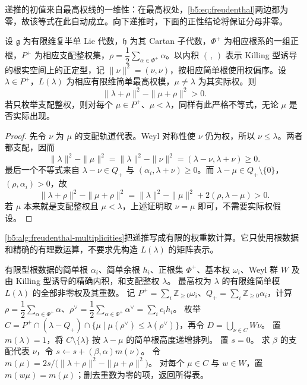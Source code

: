 递推的初值来自最高权线的一维性：在最高权处，\eqref{b5:eq:freudenthal}两边都为零，故该等式在此自动成立。向下递推时，下面的正性结论将保证分母非零。

\begin{proposition}\label{b5:prop:freudenthal-denominator}
	设 \(\mathfrak g\) 为有限维复半单 Lie 代数，\(\mathfrak h\) 为其 Cartan 子代数，\(\Phi^+\) 为相应根系的一组正根，\(P^+\) 为相应支配整权集，\(\rho=\dfrac12\sum_{\alpha\in\Phi^+}\alpha\)。以内积 \((\, ,\,)\) 表示 Killing 型诱导的根实空间上的正定型，记 \(\|\nu\|^2=(\nu,\nu)\)，按相应简单根使用权偏序。设 \(\lambda\in P^+\)，\(L(\lambda)\) 为相应有限维简单最高权模，\(\mu\ne\lambda\) 为其实际权。则
	\[
		\|\lambda+\rho\|^2-\|\mu+\rho\|^2>0.
	\]
	若只枚举支配整权，则对每个 \(\mu\in P^+\)、\(\mu<\lambda\)，同样有此严格不等式，无论 \(\mu\) 是否实际出现。
\end{proposition}
\begin{proof}
	先令 \(\nu\) 为 \(\mu\) 的支配轨道代表。Weyl 对称性使 \(\nu\) 仍为权，所以 \(\nu\le\lambda\)。两者都支配，因而
	\[
		\|\lambda\|^2-\|\mu\|^2 =\|\lambda\|^2-\|\nu\|^2 =(\lambda-\nu,\lambda+\nu)\ge0.
	\]
	最后一个不等式来自 \(\lambda-\nu\in Q_+\) 与 \((\alpha_i,\lambda+\nu)\ge0\)。而 \(\lambda-\mu\in Q_+\setminus\{0\}\)， \((\rho,\alpha_i)>0\)，故
	\[
		\|\lambda+\rho\|^2-\|\mu+\rho\|^2 =\|\lambda\|^2-\|\mu\|^2+2(\rho,\lambda-\mu)>0.
	\]
	若 \(\mu\) 本来就是支配整权且 \(\mu<\lambda\)，上述证明取 \(\nu=\mu\) 即可，不需要实际权假设。
\end{proof}

\cref{b5:alg:freudenthal-multiplicities}把递推写成有限的权重数计算。它只使用根数据和精确的有理数运算，不要求先构造 \(L(\lambda)\) 的矩阵表示。

\begin{algorithm}[htbp]
	\caption{Freudenthal 权重数计算}
	\label{b5:alg:freudenthal-multiplicities}
	\begin{algorithmsteps}
		{有限型根数据的简单根 \(\alpha_i\)、简单余根 \(h_i\)、正根集 \(\Phi^+\)、基本权 \(\omega_i\)、Weyl 群 \(W\) 及由 Killing 型诱导的精确内积，和支配整权 \(\lambda\)。}
		{最高权为 \(\lambda\) 的有限维简单模 \(L(\lambda)\) 的全部非零权及其重数。}
		\State 记 \(P^+=\sum_i\mathbb Z_{\ge0}\omega_i\)、\(Q_+=\sum_i\mathbb Z_{\ge0}\alpha_i\)，计算
		\(\rho=\dfrac12\sum_{\alpha\in\Phi^+}\alpha\)、\(\rho^\vee=\dfrac12\sum_{\alpha\in\Phi^+}\alpha^\vee=\sum_i c_i h_i\)。
		\State 枚举 \(C=P^+\cap(\lambda-Q_+)\cap\{\mu\mid\mu(\rho^\vee)\le\lambda(\rho^\vee)\}\)，再令 \(D=\bigcup_{\nu\in C}W\nu\)。
		\State 置 \(m(\lambda)=1\)，将 \(C\setminus\{\lambda\}\) 按 \(\lambda-\mu\) 的简单根高度递增排列。
			\State 置 \(s=0\)。
				\State 求 \(\beta\) 的支配代表 \(\nu\)，令 \(s\gets s+(\beta,\alpha)m(\nu)\)。
			\EndFor
			\State 令 \(m(\mu)=2s/\bigl(\|\lambda+\rho\|^2-\|\mu+\rho\|^2\bigr)\)。
		\EndFor
		\State 对每个 \(\mu\in C\) 与 \(w\in W\)，置 \(m(w\mu)=m(\mu)\)；删去重数为零的项，返回所得表。
	\end{algorithmsteps}
\end{algorithm}

